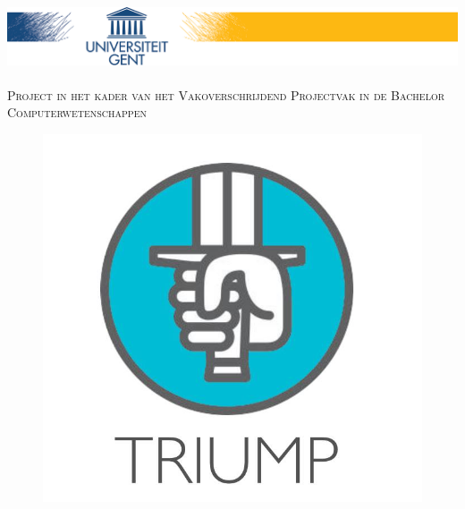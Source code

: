 \documentclass[a4paper,11.5pt]{report}
\begin{document}



\begin{titlepage}
\begin{center}

\includegraphics[width=\linewidth]{ugent}~\\[2.0cm]

\textsc{Project in het kader van het Vakoverschrijdend Projectvak in de Bachelor Computerwetenschappen}\\[1.0cm]




\begin{figure}[H]
	\centering
	\includegraphics[scale=0.25]{triump}
	\label{fig:titelblad}
	

\end{figure}
\end{center}
\end{titlepage}
\end{document}
